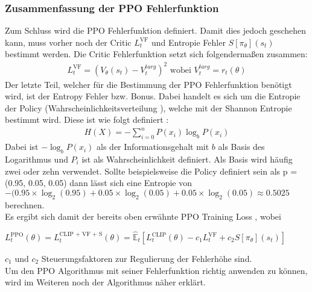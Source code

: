 \subsubsection{Zusammenfassung der PPO Fehlerfunktion} \label{subsubsec:Grundlagen_PPO_Fehlerfunktion} 
Zum Schluss wird die PPO Fehlerfunktion definiert. Damit dies jedoch geschehen kann, muss vorher noch der Critic $L^{\text{VF}}_{t}$ und Entropie Fehler $S[\pi_{\theta}](s_{t})$ bestimmt werden. Die Critic Fehlerfunktion setzt sich folgendermaßen zusammen:
\begin{align}
	L^{\text{VF}}_{t} = (V_{\theta}(s_{t})-V_{t}^{targ})^2 \text{ wobei } V_{t}^{targ} = r_{t}(\theta)
	\label{eq:Grundlagen_Critic_Loss}
\end{align} 
Der letzte Teil, welcher für die Bestimmung der PPO Fehlerfunktion benötigt wird, ist der Entropy Fehler bzw. Bonus. Dabei handelt es sich um die Entropie der Policy (Wahrscheinlichkeitsverteilung ), welche mit der Shannon Entropie bestimmt wird. Diese ist wie folgt definiert \citep{shannon}:
\begin{align}
	H(X) = -\sum_{i = 0}^{n} P(x_i) \log_{b}P(x_i)
\end{align}
Dabei ist $-\log_{b} P(x_i)$ als der Informationsgehalt mit $b$ als Basis des Logarithmus und $P_i$ ist als Wahrscheinlichkeit definiert. Als Basis wird häufig zwei oder zehn verwendet. Sollte beispielsweise die Policy definiert sein als p = (0.95, 0.05, 0.05) dann lässt sich eine Entropie von $- (0.95 \times \log_{2}(0.95) + 0.05 \times \log_{2}(0.05) + 0.05 \times \log_{2}(0.05) \approx 0.5025$ berechnen.\\
Es ergibt sich damit der bereits oben erwähnte PPO Training Loss , wobei
\begin{center}
	$L^\text{PPO}_{t} (\theta) = L^\text{CLIP + VF + S}_{t} (\theta) = \mathbb{\hat{E}}_{t} [L^{\text{CLIP}}_{t}(\theta) - c_{1}L^{\text{VF}}_{t} + c_{2}S[\pi_{\theta}](s_{t})]$
\end{center}
$c_1 \text{ und } c_2$ Steuerungsfaktoren zur Regulierung der Fehlerhöhe sind.\\
Um den PPO Algorithmus mit seiner Fehlerfunktion richtig anwenden zu können, wird im Weiteren noch der Algorithmus näher erklärt.

